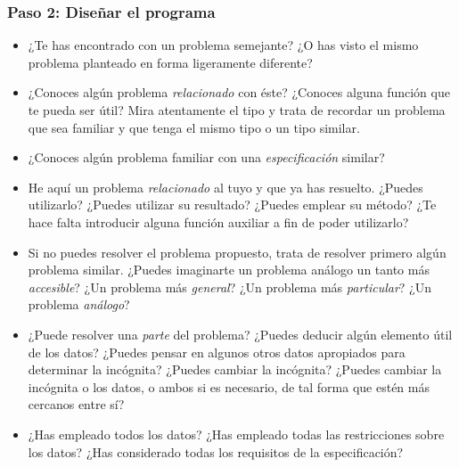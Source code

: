 \subsubsection*{Paso 2: Diseñar el programa}
\begin{itemize}
\item ¿Te has encontrado con un problema semejante? ¿O has visto el mismo
  problema planteado en forma ligeramente diferente?
\item ¿Conoces algún problema \emph{relacionado} con éste? ¿Conoces alguna
  función que te pueda ser útil? Mira atentamente el tipo y trata de recordar un
  problema que sea familiar y que tenga el mismo tipo o un tipo similar.
\item ¿Conoces algún problema familiar con una \emph{especificación} similar?
\item He aquí un problema \emph{relacionado} al tuyo y que ya has
  resuelto. ¿Puedes utilizarlo? ¿Puedes utilizar su resultado? ¿Puedes emplear
  su método? ¿Te hace falta introducir alguna función auxiliar a fin de poder
  utilizarlo?
\item Si no puedes resolver el problema propuesto, trata de resolver primero
  algún problema similar. ¿Puedes imaginarte un problema análogo un
  tanto más \emph{accesible}? ¿Un problema más \emph{general}? ¿Un problema más
  \emph{particular}? ¿Un problema \emph{análogo}?
\item ¿Puede resolver una \emph{parte} del problema? ¿Puedes deducir algún
  elemento útil de los datos? ¿Puedes pensar en algunos otros datos apropiados
  para determinar la incógnita? ¿Puedes cambiar la incógnita? ¿Puedes cambiar la
  incógnita o los datos, o ambos si es necesario, de tal forma que estén más
  cercanos entre sí?
\item ¿Has empleado todos los datos? ¿Has empleado todas las restricciones
  sobre los datos? ¿Has considerado todas los requisitos de la especificación?
\end{itemize}

